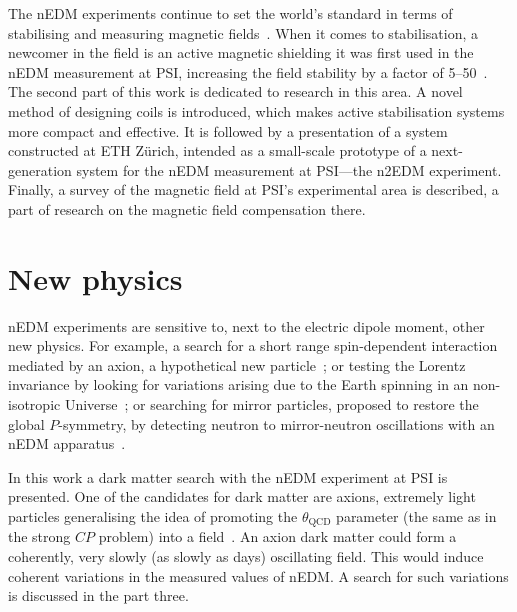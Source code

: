 The nEDM experiments continue to set the world's standard in terms of stabilising and measuring magnetic fields~\cite{GREEN1998381,1748-0221-10-12-P12003,Groeger2005,Baker2014}. When it comes to stabilisation, a newcomer in the field is an active magnetic shielding it was first used in the nEDM measurement at PSI, increasing the field stability by a factor of 5--50~\cite{Afach2014}. The second part of this work is dedicated to research in this area. A novel method of designing coils is introduced, which makes active stabilisation systems more compact and effective. It is followed by a presentation of a system constructed at ETH Zürich, intended as a small-scale prototype of a next-generation system for the nEDM measurement at PSI---the n2EDM experiment. Finally, a survey of the magnetic field at PSI's experimental area is described, a part of research on the magnetic field compensation there.




\section{New physics}
nEDM experiments are sensitive to, next to the electric dipole moment, other new physics. For example, a search for a short range spin-dependent interaction mediated by an axion, a hypothetical new particle~\cite{Afach2015Exotic}; or testing the Lorentz invariance by looking for variations arising due to the Earth spinning in an non-isotropic Universe~\cite{Altarev2009,ALTAREV20112365}; or searching for mirror particles, proposed to restore the global $P$-symmetry, by detecting neutron to mirror-neutron oscillations with an nEDM apparatus~\cite{PhysRevD.80.032003}.

In this work a dark matter search with the nEDM experiment at PSI is presented.
One of the candidates for dark matter are axions, extremely light particles generalising the idea of promoting the $\theta_\text{QCD}$ parameter (the same as in the strong $CP$ problem) into a field~\cite{PhysRevLett.38.1440}. An axion dark matter could form a coherently, very slowly (as slowly as days) oscillating field. This would induce coherent variations in the measured values of nEDM\@. A search for such variations is discussed in the part three.